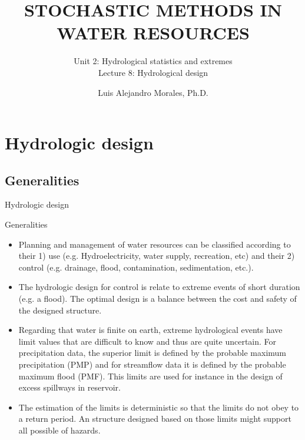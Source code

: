 \documentclass[8pt]{beamer}
\title{STOCHASTIC METHODS IN WATER RESOURCES}
\subtitle{Unit 2: Hydrological statistics and extremes \\ Lecture 8: Hydrological design}
\author{Luis Alejandro Morales, Ph.D.}
\institute{Universidad Nacional de Colombia \\ Department of Civil and Agriculture Engineering} %
\renewcommand{\emph}[1]{\textcolor{myorange}{#1}}
\begin{document}
\begin{frame}
    \titlepage
\end{frame}

\section{Hydrologic design}
\subsection{Generalities}
\begin{frame}{Hydrologic design}
   \begin{block}{Generalities}
   \end{block}
   \begin{itemize}
       \item \emph{Planning and management} of water resources can be classified according to their 1) \alert{use} (e.g. Hydroelectricity, water supply, recreation, etc) and their 2) \alert{control} (e.g. drainage, flood, contamination, sedimentation, etc.). 
       \item The \alert{hydrologic design} for \emph{control} is relate to extreme events of short duration (e.g. a flood). The \emph{optimal design} is a balance between the \emph{cost} and \emph{safety} of the designed structure. 
       \item Regarding that water is finite on earth,  extreme hydrological events have \emph{limit values} that are difficult to know and thus are quite uncertain. For \emph{precipitation} data, the superior limit is defined by the \emph{probable maximum precipitation (PMP)} and for \emph{streamflow} data it is defined by the \emph{probable maximum flood (PMF)}. This limits are used for instance in the \emph{design} of excess \emph{spillways} in reservoir.
       \item The estimation of the limits is deterministic so that the limits do not obey to a \emph{return period}. An structure designed based on those limits  might support all possible of hazards. 
   \end{itemize}
\end{frame}
\end{document}
